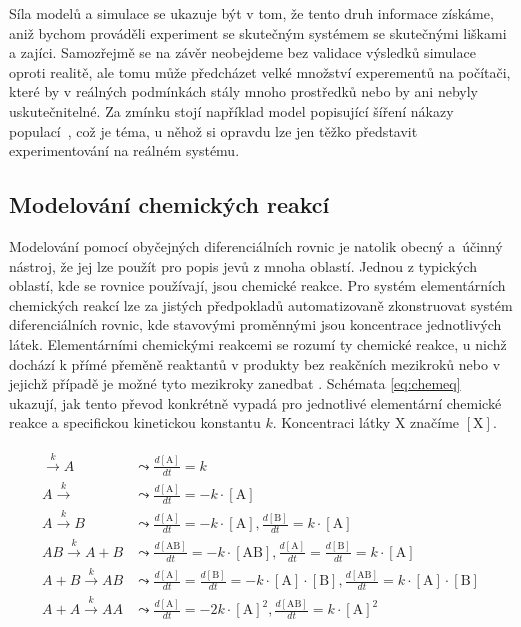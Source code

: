 Síla modelů a simulace se ukazuje být v tom, že tento druh informace získáme, aniž bychom prováděli
experiment se skutečným systémem se  skutečnými liš\-ka\-mi a zajíci. Samozřejmě se na závěr neobejdeme
bez validace výsledků simulace oproti realitě, ale tomu může předcházet velké množství
experementů na počítači, které by v reálných podmínkách stály mnoho prostředků nebo by ani 
nebyly uskutečnitelné. Za zmínku stojí na\-pří\-klad model popisující šíření nákazy
populací~\cite{kermack1927}, což je téma, u něhož si opravdu lze jen těžko představit
experimentování na reálném systému.

\subsection{Modelování chemických reakcí}

Modelování pomocí obyčejných diferenciálních rovnic je natolik obecný a~ú\-čin\-ný nástroj,
že jej lze použít pro popis jevů z mnoha oblastí. Jednou z typických oblastí, kde
se rovnice používají, jsou chemické reakce. Pro systém elementárních chemických reakcí
lze za jistých před\-po\-kla\-dů automatizovaně zkonstruovat systém diferenciálních rovnic,
kde stavovými proměnnými jsou koncentrace jednotlivých látek. Elementárními che\-mic\-ký\-mi
reakcemi se rozumí ty chemické reakce, u nichž dochází k přímé přeměně reaktantů
v produkty bez reakčních mezikroků nebo v jejichž pří\-pa\-dě je možné tyto mezikroky zanedbat \cite{horn1972}.
Schémata \ref{eq:chemeq} ukazují, jak tento převod konkrétně vypadá pro jednotlivé
elementární chemické reakce a specifickou kinetickou konstantu $k$. Koncentraci látky
$\textrm{X}$ značíme $[\textrm{X}]$.

\begin{align}\label{eq:chemeq}
\begin{array}{ll}
\xrightarrow{k} A			&\leadsto \frac{d[\textrm{A}]}{dt} = k						\\
A \xrightarrow{k} 			&\leadsto \frac{d[\textrm{A}]}{dt} = - k \cdot [\textrm{A}]	\\
A \xrightarrow{k} B			&\leadsto \frac{d[\textrm{A}]}{dt} = - k \cdot [\textrm{A}], \frac{d[\textrm{B}]}{dt} = k \cdot [\textrm{A}] \\
AB \xrightarrow{k} A + B	&\leadsto \frac{d[\textrm{AB}]}{dt} = - k \cdot [\textrm{AB}], \frac{d[\textrm{A}]}{dt} = \frac{d[\textrm{B}]}{dt} = k \cdot [\textrm{A}] \\
A + B \xrightarrow{k} AB	&\leadsto \frac{d[\textrm{A}]}{dt} = \frac{d[\textrm{B}]}{dt} = - k \cdot [\textrm{A}] \cdot [\textrm{B}], \frac{d[\textrm{AB}]}{dt} = k \cdot [\textrm{A}] \cdot [\textrm{B}] \\
A + A \xrightarrow{k} AA	&\leadsto \frac{d[\textrm{A}]}{dt} = - 2k \cdot [\textrm{A}]^2, \frac{d[\textrm{AB}]}{dt} = k \cdot [\textrm{A}]^2 \\
\end{array}
\end{align}

